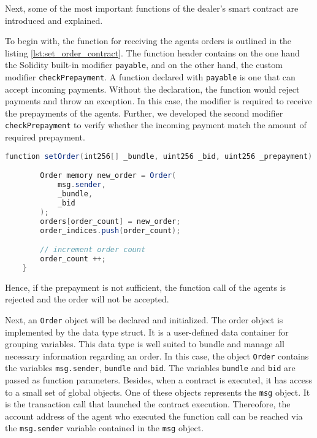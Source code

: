 Next, some of the most important functions of the dealer's smart contract are introduced and explained.

To begin with, the function for receiving the agents orders is outlined in the listing \ref{lst:set_order_contract}.
The function header contains on the one hand the Solidity built-in modifier \verb|payable|, and on the other hand, the custom
modifier \verb|checkPrepayment|. A function declared with \verb|payable| is one that can accept incoming payments. 
Without the declaration, the function would reject payments and throw an exception. In this case, the modifier is required 
to receive the prepayments of the agents. 
Further, we developed the second modifier \verb|checkPrepayment| to verify whether the incoming payment match the amount
of required prepayment.

\begin{lstlisting}[float=htbp, label=lst:set_order_contract, caption=Receiving agents orders, language=Java]
    function setOrder(int256[] _bundle, uint256 _bid, uint256 _prepayment) public payable checkPrepayment(_prepayment) {

        Order memory new_order = Order(
            msg.sender,
            _bundle,
            _bid
        );
        orders[order_count] = new_order;
        order_indices.push(order_count);

        // increment order count
        order_count ++;
    }
\end{lstlisting}

Hence, if the prepayment is not sufficient, the function call of the agents is rejected and 
the order will not be accepted.

Next, an \verb|Order| object will be declared and initialized. The order object is implemented by the data type
struct. It is a user-defined data container for grouping variables.
This data type is well suited to bundle and manage all necessary information regarding an order.
In this case, the object \verb|Order| contains the variables \verb|msg.sender|, \verb|bundle| and \verb|bid|.
The variables \verb|bundle| and \verb|bid| are passed as function parameters.
Besides, when a contract is executed, it has access to a small set of global objects. 
One of these objects represents the \verb|msg| object. It is the transaction call that launched the contract execution.
Thereofore, the account address of the agent who executed the function call can be reached via the \verb|msg.sender| variable
contained in the \verb|msg| object.

